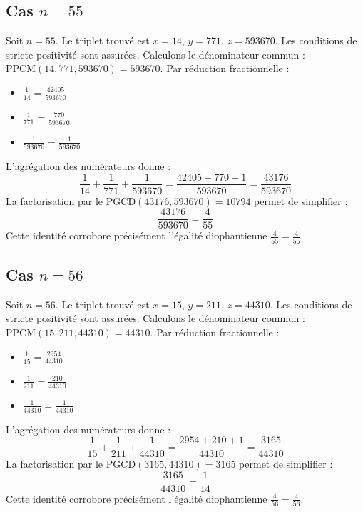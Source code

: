 \documentclass[11pt,a4paper]{article}
\begin{document}
\subsection{Cas $n = 55$}
Soit $n = 55$. Le triplet trouvé est $x = 14$, $y = 771$, $z = 593670$.
Les conditions de stricte positivité sont assurées.
Calculons le dénominateur commun : $\text{PPCM}(14, 771, 593670) = 593670$.
Par réduction fractionnelle :
\begin{itemize}
    \item $\frac{1}{14} = \frac{42405}{593670}$
    \item $\frac{1}{771} = \frac{770}{593670}$
    \item $\frac{1}{593670} = \frac{1}{593670}$
\end{itemize}
L'agrégation des numérateurs donne :
$$ \frac{1}{14} + \frac{1}{771} + \frac{1}{593670} = \frac{42405 + 770 + 1}{593670} = \frac{43176}{593670} $$
La factorisation par le $\text{PGCD}(43176, 593670) = 10794$ permet de simplifier :
$$ \frac{43176}{593670} = \frac{4}{55} $$
Cette identité corrobore précisément l'égalité diophantienne $\frac{4}{55} = \frac{4}{55}$.

\subsection{Cas $n = 56$}
Soit $n = 56$. Le triplet trouvé est $x = 15$, $y = 211$, $z = 44310$.
Les conditions de stricte positivité sont assurées.
Calculons le dénominateur commun : $\text{PPCM}(15, 211, 44310) = 44310$.
Par réduction fractionnelle :
\begin{itemize}
    \item $\frac{1}{15} = \frac{2954}{44310}$
    \item $\frac{1}{211} = \frac{210}{44310}$
    \item $\frac{1}{44310} = \frac{1}{44310}$
\end{itemize}
L'agrégation des numérateurs donne :
$$ \frac{1}{15} + \frac{1}{211} + \frac{1}{44310} = \frac{2954 + 210 + 1}{44310} = \frac{3165}{44310} $$
La factorisation par le $\text{PGCD}(3165, 44310) = 3165$ permet de simplifier :
$$ \frac{3165}{44310} = \frac{1}{14} $$
Cette identité corrobore précisément l'égalité diophantienne $\frac{4}{56} = \frac{4}{56}$.
\end{document}
